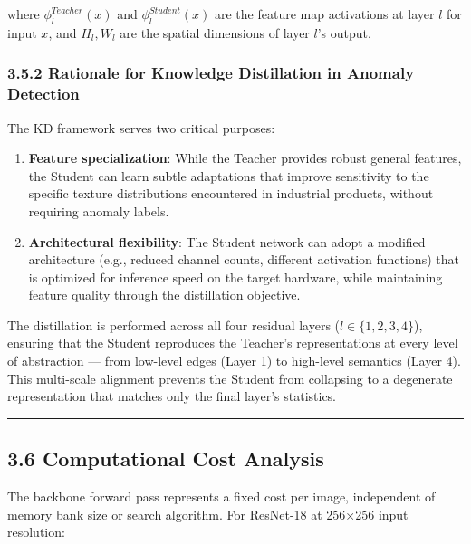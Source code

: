 where \(\phi_l^{Teacher}(x)\) and \(\phi_l^{Student}(x)\) are the feature map activations at layer \(l\) for input \(x\), and \(H_l, W_l\) are the spatial dimensions of layer \(l\)'s output.

\subsubsection{3.5.2 Rationale for Knowledge Distillation in Anomaly Detection}\label{rationale-for-knowledge-distillation-in-anomaly-detection}

The KD framework serves two critical purposes:

\begin{enumerate}
\def\labelenumi{\arabic{enumi}.}
\item
  \textbf{Feature specialization}: While the Teacher provides robust general features, the Student can learn subtle adaptations that improve sensitivity to the specific texture distributions encountered in industrial products, without requiring anomaly labels.
\item
  \textbf{Architectural flexibility}: The Student network can adopt a modified architecture (e.g., reduced channel counts, different activation functions) that is optimized for inference speed on the target hardware, while maintaining feature quality through the distillation objective.
\end{enumerate}

The distillation is performed across all four residual layers (\(l \in \{1,2,3,4\}\)), ensuring that the Student reproduces the Teacher's representations at every level of abstraction --- from low-level edges (Layer 1) to high-level semantics (Layer 4). This multi-scale alignment prevents the Student from collapsing to a degenerate representation that matches only the final layer's statistics.

\begin{center}\rule{0.5\linewidth}{0.5pt}\end{center}

\subsection{3.6 Computational Cost Analysis}\label{computational-cost-analysis}

The backbone forward pass represents a fixed cost per image, independent of memory bank size or search algorithm. For ResNet-18 at 256×256 input resolution:

